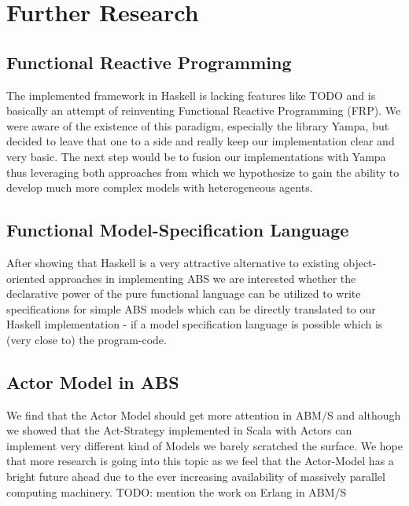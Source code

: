 \section{Further Research}

\subsection{Functional Reactive Programming}
The implemented framework in Haskell is lacking features like TODO and is basically an attempt of reinventing Functional Reactive Programming (FRP). We were aware of the existence of this paradigm, especially the library Yampa, but decided to leave that one to a side and really keep our implementation clear and very basic. The next step would be to fusion our implementations with Yampa thus leveraging both approaches from which we hypothesize to gain the ability to develop much more complex models with heterogeneous agents.

\subsection{Functional Model-Specification Language}
After showing that Haskell is a very attractive alternative to existing object-oriented approaches in implementing ABS we are interested whether the declarative power of the pure functional language can be utilized to write specifications for simple ABS models which can be directly translated to our Haskell implementation - if a model specification language is possible which is (very close to) the program-code.

\subsection{Actor Model in ABS}
We find that the Actor Model should get more attention in ABM/S and although we showed that the Act-Strategy implemented in Scala with Actors can implement very different kind of Models we barely scratched the surface. We hope that more research is going into this topic as we feel that the Actor-Model has a bright future ahead due to the ever increasing availability of massively parallel computing machinery. TODO: mention the work on Erlang in ABM/S 